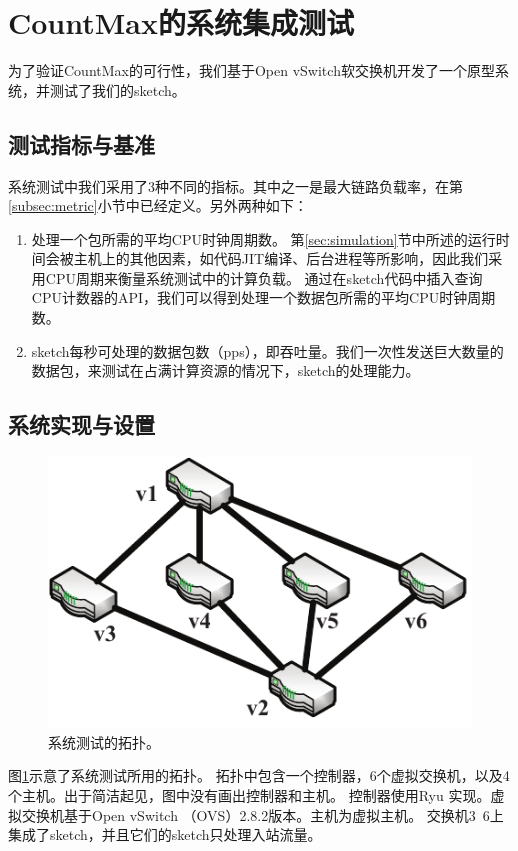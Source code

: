 \section{CountMax的系统集成测试}\label{sec:proto}

为了验证CountMax的可行性，我们基于Open vSwitch软交换机开发了一个原型系统，并测试了我们的sketch。

\subsection{测试指标与基准}\label{sec:testbedmetric}
系统测试中我们采用了3种不同的指标。其中之一是最大链路负载率，在第\ref{subsec:metric}小节中已经定义。另外两种如下：
\begin{enumerate}
	\item
    处理一个包所需的平均CPU时钟周期数。
    第\ref{sec:simulation}节中所述的运行时间会被主机上的其他因素，如代码JIT编译、后台进程等所影响，因此我们采用CPU周期来衡量系统测试中的计算负载\cite{huang2017sketchvisor}。
    通过在sketch代码中插入查询CPU计数器的API，我们可以得到处理一个数据包所需的平均CPU时钟周期数。
	\item
    sketch每秒可处理的数据包数（pps），即吞吐量。我们一次性发送巨大数量的数据包，来测试在占满计算资源的情况下，sketch的处理能力。
\end{enumerate}


\subsection{系统实现与设置}
\begin{figure}[ht]
	\centering
	\includegraphics[width=0.68\linewidth]{fig/topo.pdf}
	\caption{\textnormal{系统测试的拓扑。}}
	\label{fig:prototypetopo}
\end{figure}

图\ref{fig:prototypetopo}示意了系统测试所用的拓扑。
拓扑中包含一个控制器，6个虚拟交换机，以及4个主机。出于简洁起见，图中没有画出控制器和主机。
控制器使用Ryu \cite{ryu}实现。虚拟交换机基于Open vSwitch （OVS）2.8.2版本\cite{openvswitch}。主机为虚拟主机。
交换机3~6上集成了sketch，并且它们的sketch只处理入站流量。

